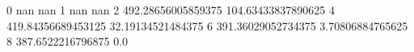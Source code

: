 0 nan nan
1 nan nan
2 492.28656005859375 104.63433837890625
4 419.84356689453125 32.19134521484375
6 391.36029052734375 3.70806884765625
8 387.6522216796875 0.0
